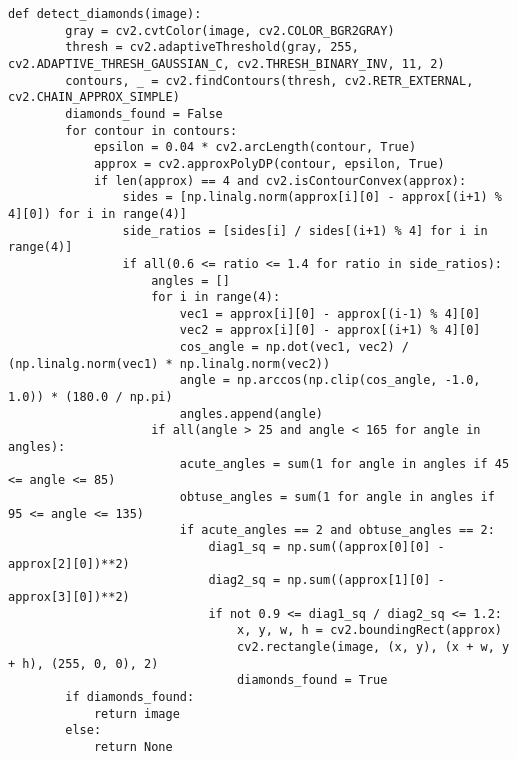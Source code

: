 \begin{lstlisting}[caption={Определение ромба}]
    def detect_diamonds(image):
        gray = cv2.cvtColor(image, cv2.COLOR_BGR2GRAY)
        thresh = cv2.adaptiveThreshold(gray, 255, cv2.ADAPTIVE_THRESH_GAUSSIAN_C, cv2.THRESH_BINARY_INV, 11, 2)
        contours, _ = cv2.findContours(thresh, cv2.RETR_EXTERNAL, cv2.CHAIN_APPROX_SIMPLE)
        diamonds_found = False
        for contour in contours:
            epsilon = 0.04 * cv2.arcLength(contour, True)
            approx = cv2.approxPolyDP(contour, epsilon, True)
            if len(approx) == 4 and cv2.isContourConvex(approx):
                sides = [np.linalg.norm(approx[i][0] - approx[(i+1) % 4][0]) for i in range(4)]
                side_ratios = [sides[i] / sides[(i+1) % 4] for i in range(4)]
                if all(0.6 <= ratio <= 1.4 for ratio in side_ratios):
                    angles = []
                    for i in range(4):
                        vec1 = approx[i][0] - approx[(i-1) % 4][0]
                        vec2 = approx[i][0] - approx[(i+1) % 4][0]
                        cos_angle = np.dot(vec1, vec2) / (np.linalg.norm(vec1) * np.linalg.norm(vec2))
                        angle = np.arccos(np.clip(cos_angle, -1.0, 1.0)) * (180.0 / np.pi)
                        angles.append(angle)
                    if all(angle > 25 and angle < 165 for angle in angles):
                        acute_angles = sum(1 for angle in angles if 45 <= angle <= 85)
                        obtuse_angles = sum(1 for angle in angles if 95 <= angle <= 135)
                        if acute_angles == 2 and obtuse_angles == 2:
                            diag1_sq = np.sum((approx[0][0] - approx[2][0])**2)
                            diag2_sq = np.sum((approx[1][0] - approx[3][0])**2)
                            if not 0.9 <= diag1_sq / diag2_sq <= 1.2:
                                x, y, w, h = cv2.boundingRect(approx)
                                cv2.rectangle(image, (x, y), (x + w, y + h), (255, 0, 0), 2)
                                diamonds_found = True
        if diamonds_found:
            return image
        else:
            return None
\end{lstlisting}

